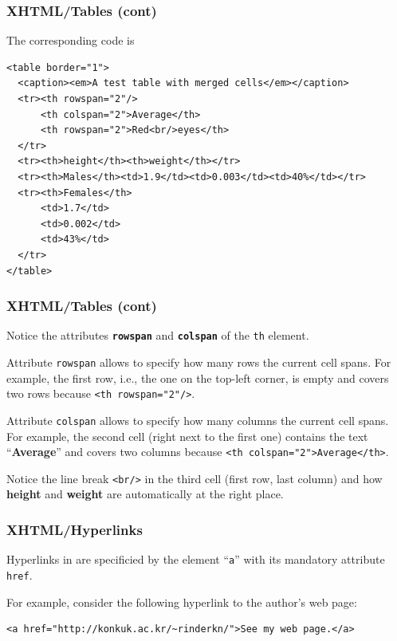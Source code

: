 %
\begin{frame}[containsverbatim]
\frametitle{XHTML/Tables (cont)}

The corresponding \HTML code is
{\small
\begin{verbatim}
<table border="1">
  <caption><em>A test table with merged cells</em></caption>
  <tr><th rowspan="2"/>
      <th colspan="2">Average</th>
      <th rowspan="2">Red<br/>eyes</th>
  </tr>
  <tr><th>height</th><th>weight</th></tr>
  <tr><th>Males</th><td>1.9</td><td>0.003</td><td>40%</td></tr>
  <tr><th>Females</th>
      <td>1.7</td>
      <td>0.002</td>
      <td>43%</td>
  </tr>
</table>
\end{verbatim}
}

\end{frame}

%
\begin{frame}[containsverbatim]
\frametitle{XHTML/Tables (cont)}

Notice the attributes \texttt{\textbf{rowspan}} and
\textbf{\texttt{colspan}} of the \texttt{th} element.

\bigskip

Attribute \texttt{rowspan} allows to specify how many rows the current
cell spans. For example, the first row, i.e., the one on the
top-left corner, is empty and covers two rows because
\verb|<th rowspan="2"/>|.

\bigskip

Attribute \texttt{colspan} allows to specify how many columns the
current cell spans. For example, the second cell (right next to the
first one) contains the text ``\textbf{Average}'' and covers two
columns because \verb|<th colspan="2">Average</th>|.

\bigskip

Notice the line break \verb|<br/>| in the third cell (first row, last
column) and how \textbf{height} and \textbf{weight} are automatically
at the right place.

\end{frame}

%
\begin{frame}[containsverbatim]
\frametitle{XHTML/Hyperlinks}

Hyperlinks in \XHTML are specificied by the element ``\texttt{a}''
with its mandatory attribute \texttt{href}.

\bigskip

For example, consider the following hyperlink to the author's web
page:
{\small
\begin{verbatim}
<a href="http://konkuk.ac.kr/~rinderkn/">See my web page.</a>
\end{verbatim}
}

\end{frame}

